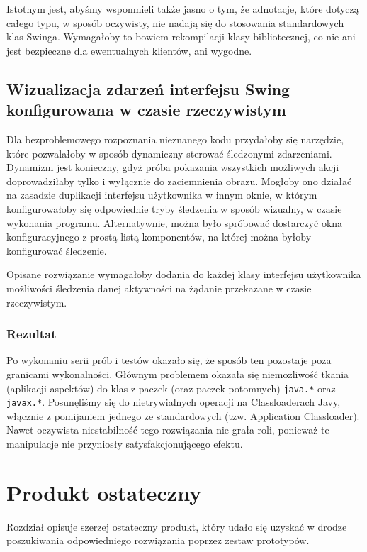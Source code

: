 \documentclass[12pt,a4paper,titlepage]{article}
\begin{document}
  Istotnym jest, abyśmy wspomnieli także jasno o tym, że adnotacje, które dotyczą całego typu, w sposób oczywisty, nie nadają się do stosowania standardowych klas Swinga. Wymagałoby to bowiem rekompilacji klasy bibliotecznej, co nie ani jest bezpieczne dla ewentualnych klientów, ani wygodne.

 \subsection{Wizualizacja zdarzeń interfejsu Swing konfigurowana w czasie rzeczywistym}
 Dla bezproblemowego rozpoznania nieznanego kodu przydałoby się narzędzie, które pozwalałoby w sposób dynamiczny sterować śledzonymi zdarzeniami. Dynamizm jest konieczny, gdyż próba pokazania wszystkich możliwych akcji doprowadziłaby tylko i wyłącznie do zaciemnienia obrazu. Mogłoby ono działać na zasadzie duplikacji interfejsu użytkownika w innym oknie, w którym konfigurowałoby się odpowiednie tryby śledzenia w sposób wizualny, w czasie wykonania programu. Alternatywnie, można było spróbować dostarczyć okna konfiguracyjnego z prostą listą komponentów, na której można byłoby konfigurować śledzenie.
 
 Opisane rozwiązanie wymagałoby dodania do każdej klasy interfejsu użytkownika możliwości śledzenia danej aktywności na żądanie przekazane w czasie rzeczywistym.
 
  \subsubsection*{Rezultat}
   Po wykonaniu serii prób i testów okazało się, że sposób ten pozostaje poza granicami wykonalności. Głównym problemem okazała się niemożliwość tkania (aplikacji aspektów) do klas z paczek (oraz paczek potomnych) \texttt{java.*} oraz \texttt{javax.*}. Posunęliśmy się do nietrywialnych operacji na Classloaderach Javy, włącznie z pomijaniem jednego ze standardowych (tzw. Application Classloader). Nawet oczywista niestabilność tego rozwiązania nie grała roli, ponieważ te manipulacje nie przyniosły satysfakcjonującego efektu.
   
\section{Produkt ostateczny}
 Rozdział opisuje szerzej ostateczny produkt, który udało się uzyskać w drodze poszukiwania odpowiedniego rozwiązania poprzez zestaw prototypów. 
  
\end{document}
